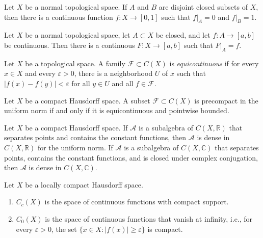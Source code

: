 \begin{theorem}[Urysohn]
\label{theorem-urysohn}
Let $X$ be a normal topological space. If $A$
and $B$ are disjoint closed subsets of $X$,
then there is a continuous function
$f:X\to[0,1]$ such that $f|_A=0$ and
$f|_B=1$.
\end{theorem}

\begin{theorem}[Tietze]
\label{theorem-tietze}
Let $X$ be a normal topological space, let
$A\subset X$ be closed, and let $f:A\to[a,b]$
be continuous. Then there is a continuous
$F:X\to[a,b]$ such that $F|_A=f$.
\end{theorem}

\begin{definition}
\label{definition-equicontinuous}
Let $X$ be a topological space. A family
$\mathcal F \subset C(X)$ is {\it
equicontinuous} if for every $x\in X$ and
every $\varepsilon>0$, there is a
neighborhood $U$ of $x$ such that
$|f(x)-f(y)|<\varepsilon$ for all $y\in U$
and all $f\in\mathcal F$.
\end{definition}

\begin{theorem}
\label{theorem-arzela-ascoli}
Let $X$ be a compact Hausdorff space. A
subset $\mathcal F \subset C(X)$ is
precompact in the uniform norm if and only if
it is equicontinuous and pointwise bounded.
\end{theorem}

\begin{theorem}
\label{theorem-stone-weierstrass}
Let $X$ be a compact Hausdorff space. If
$\mathcal A$ is a subalgebra of $C(X,
\mathbb{R})$ that separates points and
contains the constant functions, then
$\mathcal A$ is dense in $C(X, \mathbb{R})$
for the uniform norm. If $\mathcal A$ is a
subalgebra of $C(X, \mathbb{C})$ that
separates points, contains the constant
functions, and is closed under complex
conjugation, then $\mathcal A$ is dense in
$C(X, \mathbb{C})$.
\end{theorem}

\begin{definition}
\label{definition-cc-c0}
Let $X$ be a locally compact Hausdorff space.
\begin{enumerate}
\item $C_c(X)$ is the space of continuous
functions with compact support.
\item $C_0(X)$ is the space of continuous
functions that vanish at infinity, i.e., for
every $\varepsilon>0$, the set $\{x\in X :
|f(x)|\geq\varepsilon\}$ is compact.
\end{enumerate}
\end{definition}


